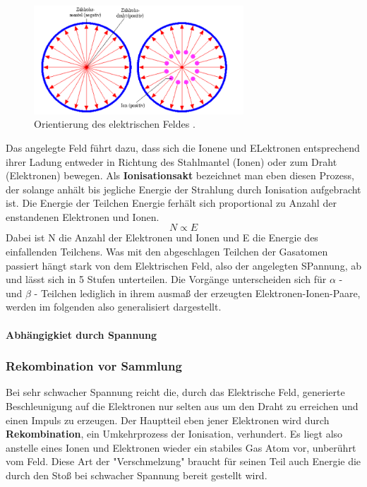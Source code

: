 \begin{figure} %
  \centering
  \includegraphics[width=0.7\textwidth]{bilder/Abbildung3.png}
  \caption{Orientierung des elektrischen Feldes \cite{leifi}.} 
  \label{fig:efeld}
\end{figure}

Das angelegte Feld führt dazu, dass sich die Ionene und ELektronen entsprechend ihrer Ladung entweder in Richtung des Stahlmantel (Ionen) oder zum Draht (Elektronen) bewegen.
Als \textbf{Ionisationsakt} bezeichnet man eben diesen Prozess, der solange anhält bis jegliche Energie der Strahlung durch Ionisation aufgebracht ist.
Die Energie der Teilchen Energie ferhält sich proportional zu Anzahl der enstandenen Elektronen und Ionen. 
\begin{equation}
\label{eqn:prop}
N \propto E
\end{equation}
Dabei ist N die Anzahl der Elektronen und Ionen und E die Energie des einfallenden Teilchens.
Was mit den abgeschlagen Teilchen der Gasatomen passiert hängt stark von dem Elektrischen Feld, also der angelegten SPannung, ab und lässt sich in 5 Stufen unterteilen.
Die Vorgänge unterscheiden sich für $\alpha$ - und $\beta$ - Teilchen lediglich in ihrem ausmaß der erzeugten Elektronen-Ionen-Paare, werden im folgenden also generalisiert dargestellt.
\paragraph{Abhängigkiet durch Spannung} \mbox{}

\subsubsection{Rekombination vor Sammlung}
\label{sub:Rekombination}
Bei sehr schwacher Spannung reicht die, durch das Elektrische Feld, generierte Beschleunigung auf die Elektronen nur selten aus um den Draht zu erreichen und einen Impuls zu erzeugen.
Der Hauptteil eben jener Elektronen wird durch \textbf{Rekombination}, ein Umkehrprozess der Ionisation, verhundert. Es liegt also anstelle eines Ionen und Elektronen wieder ein stabiles Gas Atom vor, unberührt vom Feld.
Diese Art der "Verschmelzung" braucht für seinen Teil auch Energie die durch den Stoß bei schwacher Spannung bereit gestellt wird.
